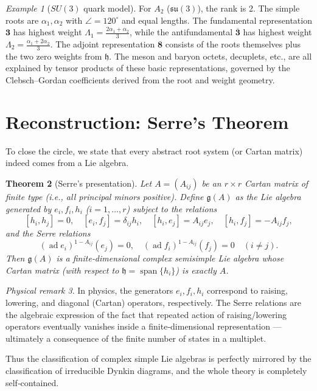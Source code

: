 \documentclass{article}
\newtheorem{theorem}{Theorem}[section]
\theoremstyle{definition}
\theoremstyle{remark}
\newtheorem{example}[theorem]{Example}
\newtheorem{physremark}[theorem]{Physical remark}
\newcommand{\ad}{\operatorname{ad}}
\newcommand{\g}{\mathfrak{g}}
\newcommand{\h}{\mathfrak{h}}
\newcommand{\Span}{\operatorname{span}}
\begin{document}
\begin{example}[$SU(3)$ quark model]
For $A_2$ ($\mathfrak{su}(3)$), the rank is 2. The simple roots are $\alpha_1,\alpha_2$
with $\angle=120^\circ$ and equal lengths. The fundamental representation $\mathbf{3}$
has highest weight $\Lambda_1 = \frac{2\alpha_1+\alpha_2}{3}$, while the antifundamental
$\overline{\mathbf{3}}$ has highest weight $\Lambda_2 = \frac{\alpha_1+2\alpha_2}{3}$. The
adjoint representation $\mathbf{8}$ consists of the roots themselves plus the two
zero weights from $\h$. The meson and baryon octets, decuplets, etc., are all explained
by tensor products of these basic representations, governed by the Clebsch–Gordan
coefficients derived from the root and weight geometry.
\end{example}

\section{Reconstruction: Serre’s Theorem}

To close the circle, we state that every abstract root system (or Cartan matrix)
indeed comes from a Lie algebra.

\begin{theorem}[Serre’s presentation]
Let $A = (A_{ij})$ be an $r\times r$ Cartan matrix of finite type (i.e., all
principal minors positive).  Define $\g(A)$ as the Lie algebra generated by
$e_i, f_i, h_i$ ($i=1,\dots,r$) subject to the relations
\[
[h_i,h_j]=0,\quad [e_i,f_j] = \delta_{ij}h_i,\quad
[h_i,e_j] = A_{ij}e_j,\quad [h_i,f_j] = -A_{ij}f_j,
\]
and the \emph{Serre relations}
\[
(\ad e_i)^{1-A_{ij}}(e_j)=0,\quad (\ad f_i)^{1-A_{ij}}(f_j)=0 \quad (i\neq j).
\]
Then $\g(A)$ is a finite‑dimensional complex semisimple Lie algebra whose
Cartan matrix (with respect to $\h = \Span\{h_i\}$) is exactly $A$.
\end{theorem}

\begin{physremark}
In physics, the generators $e_i, f_i, h_i$ correspond to raising, lowering, and
diagonal (Cartan) operators, respectively. The Serre relations are the algebraic
expression of the fact that repeated action of raising/lowering operators eventually
vanishes inside a finite‑dimensional representation — ultimately a consequence of
the finite number of states in a multiplet.
\end{physremark}

Thus the classification of complex simple Lie algebras is perfectly mirrored by
the classification of irreducible Dynkin diagrams, and the whole theory is
completely self‑contained.
\end{document}

